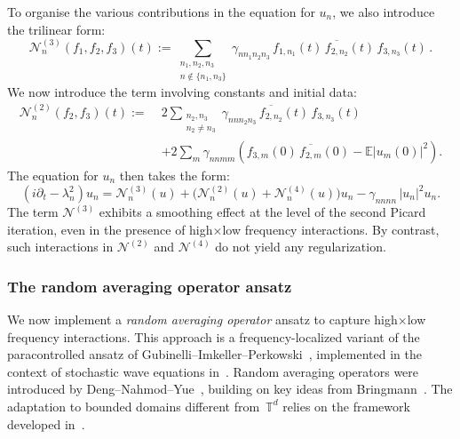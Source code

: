 \documentclass[11pt,reqno,english]{amsart}
\numberwithin{equation}{section}
\theoremstyle{plain}
\theoremstyle{definition}
\theoremstyle{remark}
\begin{document}
To organise the various contributions in the equation for $u_n$, we also introduce the trilinear form:
\begin{equation}
	\label{eq:N3}
	\mathcal{N}_n^{(3)}(f_1, f_{2}, f_{3})(t)
	:=
	\sum_{\substack{n_1, n_2, n_3 \\ n \notin \{n_1, n_3\}
	}}
	\gamma_{nn_1n_2n_3} \,
	f_{1,n_1}(t) \, \overline{f_{2,n_2}}(t) \, f_{3,n_3}(t)\,.
\end{equation}
We now introduce the term involving constants and initial data:
\begin{equation}
	\label{eq:N2}
	\begin{aligned}
		\mathcal{N}_n^{(2)}(f_{2}, f_{3})(t)
		:=\;&
		2\sum_{\substack{n_2, n_3 \\ n_2 \neq n_3}}
		\gamma_{nnn_2n_3} \, \overline{f_{2,n_2}}(t) \, f_{3,n_3}(t) \\
		&+
		2\sum_{m}
		\gamma_{nnmm} \left( f_{3,m}(0) \, \overline{f_{2,m}}(0) - \mathbb{E}|u_{m}(0)|^{2} \right).
	\end{aligned}
\end{equation}
The equation for $u_n$ then takes the form:
\begin{equation}
	\label{eq:un}
	(i\partial_t - \lambda_n^2) u_n
	= \mathcal{N}_n^{(3)}(u)
	+ \big( \mathcal{N}_n^{(2)}(u) + \mathcal{N}_n^{(4)}(u) \big) u_n
	- \gamma_{nnnn} \, |u_n|^2 u_n.
\end{equation}
The term $\mathcal{N}^{(3)}$ exhibits a smoothing effect at the level of the second Picard iteration, even in the presence of high$\times$low frequency interactions.
By contrast, such interactions in $\mathcal{N}^{(2)}$ and $\mathcal{N}^{(4)}$ do not yield any regularization.


\subsubsection{The random averaging operator ansatz}
We now implement a \emph{random averaging operator} ansatz to capture high$\times$low frequency interactions. This approach is a frequency-localized variant of the paracontrolled ansatz of Gubinelli--Imkeller--Perkowski~\cite{GIP15}, implemented in the context of stochastic wave equations in~\cite{GKO24}. Random averaging operators were introduced by Deng--Nahmod--Yue~\cite{DNY24}, building on key ideas from Bringmann~\cite{Bri20}. The adaptation to bounded domains different from~$\mathbb{T}^{d}$ relies on the framework developed in~\cite{BCST24}.
\end{document}
